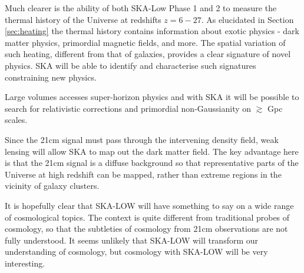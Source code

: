 \documentclass{PoS}
\begin{document}
Much clearer is the ability of both SKA-Low Phase 1 and 2 to measure the thermal history of the Universe at redshifts $z=6-27$. As elucidated in Section \ref{sec:heating} the thermal history contains information about exotic physics - dark matter physics, primordial magnetic fields, and more. The spatial variation of such heating, different from that of galaxies, provides a clear signature of novel physics. SKA will be able to identify and characterise such signatures constraining new physics. 

Large volumes accesses super-horizon physics and with SKA it will be possible to search for relativistic corrections and primordial non-Gaussianity on $\gtrsim$ Gpc scales.

Since the 21cm signal must pass through the intervening density field, weak lensing will allow SKA to map out the dark matter field. The key advantage here is that the 21cm signal is a diffuse background so that representative parts of the Universe at high redshift can be mapped, rather than extreme regions in the vicinity of galaxy clusters. 

It is hopefully clear that SKA-LOW will have something to say on a wide range of cosmological topics. The context is quite different from traditional probes of cosmology, so that the subtleties of cosmology from 21cm observations are not fully understood. It seems unlikely that SKA-LOW will transform our understanding of cosmology, but cosmology with SKA-LOW will be very interesting.





\end{document}
